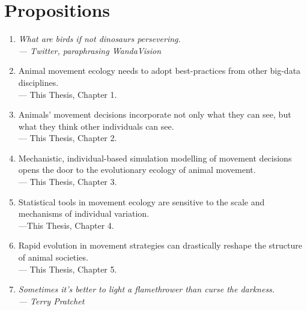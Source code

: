 \begingroup

\chapter*{Propositions}

\begin{onehalfspace}
    
    \begin{enumerate}
        \item \textit{What are birds if not dinosaurs persevering.\\--- Twitter, paraphrasing WandaVision}
        \item Animal movement ecology needs to adopt best-practices from other big-data disciplines.\\ --- This Thesis, Chapter 1.
        \item Animals' movement decisions incorporate not only what they can see, but what they think other individuals can see.\\ --- This Thesis, Chapter 2.
        \item Mechanistic, individual-based simulation modelling of movement decisions opens the door to the evolutionary ecology of animal movement. \\ --- This Thesis, Chapter 3.
        \item Statistical tools in movement ecology are sensitive to the scale and mechanisms of individual variation.\\ ---This Thesis, Chapter 4.
        \item Rapid evolution in movement strategies can drastically reshape the structure of animal societies.\\ --- This Thesis, Chapter 5.
        \item \textit{Sometimes it's better to light a flamethrower than curse the darkness.\\--- Terry Pratchet}
    \end{enumerate}

\end{onehalfspace}

\endgroup

\vfill

\clearpage
